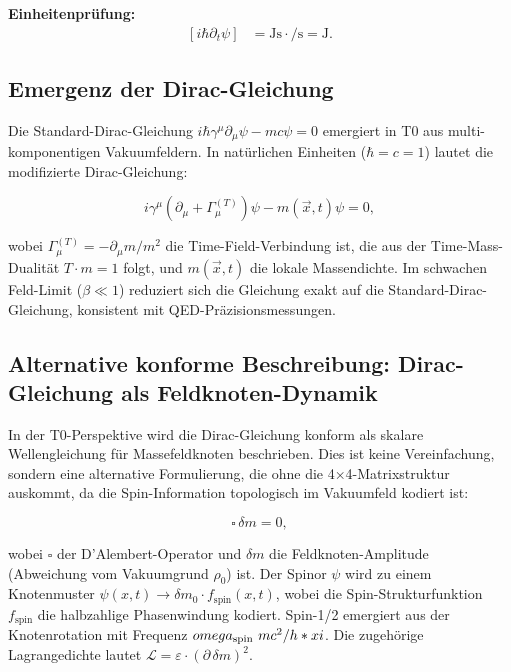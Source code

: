 	\textbf{Einheitenprüfung:}
	\[
	\begin{aligned}
		[i \hbar \partial_t \psi] &= \si{\joule\second} \cdot \si{\per\second} = \si{\joule}.
	\end{aligned}
	\]
	
	\subsection*{Emergenz der Dirac-Gleichung}
	
	Die Standard-Dirac-Gleichung \(i \hbar \gamma^\mu \partial_\mu \psi - m c \psi = 0\) emergiert in T0 aus multi-komponentigen Vakuumfeldern. In natürlichen Einheiten (\(\hbar = c = 1\)) lautet die modifizierte Dirac-Gleichung:
	
	\begin{equation}
		i\gamma^{\mu}(\partial_{\mu} + \Gamma_{\mu}^{(T)}) \psi - m(\vec{x},t) \psi = 0,
	\end{equation}
	
	wobei \(\Gamma_{\mu}^{(T)} = -\partial_{\mu} m / m^2\) die Time-Field-Verbindung ist, die aus der Time-Mass-Dualität \(T \cdot m = 1\) folgt, und \(m(\vec{x},t)\) die lokale Massendichte. Im schwachen Feld-Limit (\(\beta \ll 1\)) reduziert sich die Gleichung exakt auf die Standard-Dirac-Gleichung, konsistent mit QED-Präzisionsmessungen.
	
	\subsection*{Alternative konforme Beschreibung: Dirac-Gleichung als Feldknoten-Dynamik}
	
	In der T0-Perspektive wird die Dirac-Gleichung konform als skalare Wellengleichung für Massefeldknoten beschrieben. Dies ist keine Vereinfachung, sondern eine alternative Formulierung, die ohne die 4×4-Matrixstruktur auskommt, da die Spin-Information topologisch im Vakuumfeld kodiert ist:
	
	\begin{equation}
		\square \, \delta m = 0,
	\end{equation}
	
	wobei \(\square\) der D'Alembert-Operator und \(\delta m\) die Feldknoten-Amplitude (Abweichung vom Vakuumgrund \(\rho_0\)) ist. Der Spinor \(\psi\) wird zu einem Knotenmuster \(\psi(x,t) \to \delta m_0 \cdot f_{\text{spin}}(x,t)\), wobei die Spin-Strukturfunktion \(f_{\text{spin}}\) die halbzahlige Phasenwindung kodiert. Spin-1/2 emergiert aus der Knotenrotation mit Frequenz \(omega_{\text{spin}} ~ m c^2 / h * xi\). Die zugehörige Lagrangedichte lautet \(\mathcal{L} = \varepsilon \cdot (\partial \, \delta m)^2\).
	
